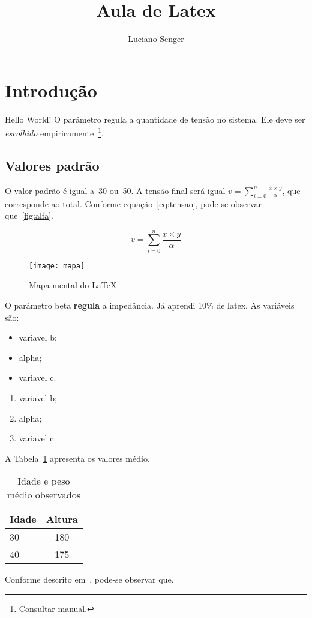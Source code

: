 \documentclass[a4paper, brazil, 12pt , twocolumn]{article}
\title{Aula de Latex}
\author{Luciano Senger}
\begin{document}
	\maketitle
\section{Introdução}

Hello    World!
O parâmetro  regula a quantidade de tensão no sistema.
Ele deve ser \textit{escolhido} empiricamente~\footnote{Consultar manual.}.
\subsection{Valores padrão}
O valor padrão é igual a~30 ou~50.
A tensão final será igual $v = \sum_{i=0}^n \frac{x \times y}{\alpha}$, que corresponde ao total.
Conforme equação~\ref{eq:tensao}, pode-se observar que~\ref{fig:alfa}.

\begin{equation}
	v = \sum_{i=0}^n \frac{x \times y}{\alpha}
\end{equation}\label{eq:tensao}

\begin{figure}[htb]
	\centering
	\texttt{[image: mapa]}
	\caption{Mapa mental do \LaTeX}
\end{figure}\label{fig:alfa}

O parâmetro {\Huge beta} \textbf{regula} a impedância.
Já aprendi 10\% de latex.
As variáveis são:
\begin{itemize}
	\item variavel b;
	\item alpha;
	\item variavel c.
\end{itemize}

\begin{enumerate}
	\item variavel b;
	\item alpha;
	\item variavel c.
\end{enumerate}
A Tabela~\ref{tab:idade} apresenta os valores médio.
\begin{table}[htb]
	\caption{Idade e peso médio observados}\label{tab:idade}
	\centering
	
	\begin{tabular}{lc}
		\hline
		\bf Idade & \bf Altura \\ 
		\hline
		30 & 180 \\
		40 & 175 \\
		\hline
		
		\end{tabular}
\end{table}
\lstset{language=Python}


Conforme descrito em~\cite{Harris2012,Hennessy2014,Goodfellow2016,Mota2011}, pode-se observar que.



\end{document}
